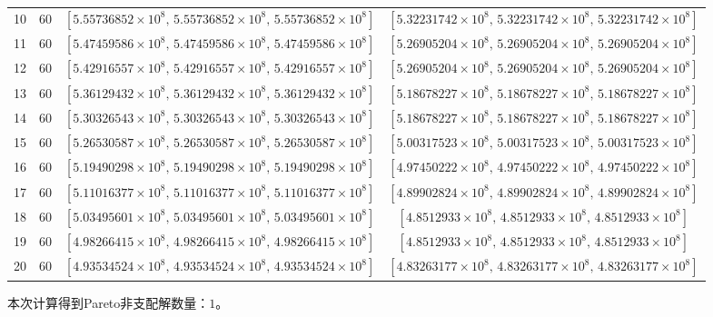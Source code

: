 \documentclass[12pt,a4paper]{article}
\begin{document}
\begin{table}[htbp]
\begin{tabular}{cccc}
		10 & 60 & $[5.55736852\times 10^{8},\,5.55736852\times 10^{8},\,5.55736852\times 10^{8}]$ & $[5.32231742\times 10^{8},\,5.32231742\times 10^{8},\,5.32231742\times 10^{8}]$ \\
		11 & 60 & $[5.47459586\times 10^{8},\,5.47459586\times 10^{8},\,5.47459586\times 10^{8}]$ & $[5.26905204\times 10^{8},\,5.26905204\times 10^{8},\,5.26905204\times 10^{8}]$ \\
		12 & 60 & $[5.42916557\times 10^{8},\,5.42916557\times 10^{8},\,5.42916557\times 10^{8}]$ & $[5.26905204\times 10^{8},\,5.26905204\times 10^{8},\,5.26905204\times 10^{8}]$ \\
		13 & 60 & $[5.36129432\times 10^{8},\,5.36129432\times 10^{8},\,5.36129432\times 10^{8}]$ & $[5.18678227\times 10^{8},\,5.18678227\times 10^{8},\,5.18678227\times 10^{8}]$ \\
		14 & 60 & $[5.30326543\times 10^{8},\,5.30326543\times 10^{8},\,5.30326543\times 10^{8}]$ & $[5.18678227\times 10^{8},\,5.18678227\times 10^{8},\,5.18678227\times 10^{8}]$ \\
		15 & 60 & $[5.26530587\times 10^{8},\,5.26530587\times 10^{8},\,5.26530587\times 10^{8}]$ & $[5.00317523\times 10^{8},\,5.00317523\times 10^{8},\,5.00317523\times 10^{8}]$ \\
		16 & 60 & $[5.19490298\times 10^{8},\,5.19490298\times 10^{8},\,5.19490298\times 10^{8}]$ & $[4.97450222\times 10^{8},\,4.97450222\times 10^{8},\,4.97450222\times 10^{8}]$ \\
		17 & 60 & $[5.11016377\times 10^{8},\,5.11016377\times 10^{8},\,5.11016377\times 10^{8}]$ & $[4.89902824\times 10^{8},\,4.89902824\times 10^{8},\,4.89902824\times 10^{8}]$ \\
		18 & 60 & $[5.03495601\times 10^{8},\,5.03495601\times 10^{8},\,5.03495601\times 10^{8}]$ & $[4.8512933\times 10^{8},\,4.8512933\times 10^{8},\,4.8512933\times 10^{8}]$ \\
		19 & 60 & $[4.98266415\times 10^{8},\,4.98266415\times 10^{8},\,4.98266415\times 10^{8}]$ & $[4.8512933\times 10^{8},\,4.8512933\times 10^{8},\,4.8512933\times 10^{8}]$ \\
		20 & 60 & $[4.93534524\times 10^{8},\,4.93534524\times 10^{8},\,4.93534524\times 10^{8}]$ & $[4.83263177\times 10^{8},\,4.83263177\times 10^{8},\,4.83263177\times 10^{8}]$ \\
		\bottomrule
	\end{tabular}
\end{table}

本次计算得到Pareto非支配解数量：$1$。
\end{document}
